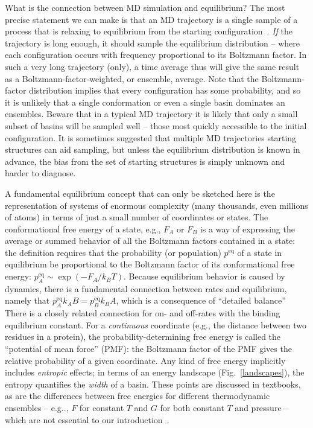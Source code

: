 \documentclass[9pt,bestpractices]{livecoms}
\newcommand{\peq}{p^{\mathrm{eq}}}
\begin{document}
What is the connection between MD simulation and equilibrium?  The most precise statement we can make is that an MD trajectory is a single sample of a process that is relaxing to equilibrium from the starting configuration~\cite{Zuckerman:2015:StatisticalBiophysicsBlog, Zuckerman:2010:}.  
\emph{If} the trajectory is long enough, it should sample the equilibrium distribution -- where each configuration occurs with frequency proportional to its Boltzmann factor.  
In such a very long trajectory (only), a time average thus will give the same result as a Boltzmann-factor-weighted, or ensemble, average.  
Note that the Boltzmann-factor distribution implies that every configuration has some probability, and so it is unlikely that a single conformation or even a single basin dominates an ensembles. 
Beware that in a typical MD trajectory it is likely that only a small subset of basins will be sampled well -- those most quickly accessible to the initial configuration.  
It is sometimes suggested that multiple MD trajectories starting structures can aid sampling, but unless the equilibrium distribution is known in advance, the bias from the set of starting structures is simply unknown and harder to diagnose.

A fundamental equilibrium concept that can only be sketched here is the representation of systems of enormous complexity (many thousands, even millions of atoms) in terms of just a small number of coordinates or states.  
The conformational free energy of a state, e.g., $F_A$ or $F_B$ is a way of expressing the average or summed behavior of all the Boltzmann factors contained in a state: the definition requires that the probability (or population) $\peq$ of a state in equilibrium be proportional to the Boltzmann factor of its conformational free energy: $\peq_A \sim \exp(-F_A/k_BT)$.  
Because equilibrium behavior is caused by dynamics, there is a fundamental connection between rates and equilibrium, namely that $\peq_A k_AB = \peq_B k_BA$, which is a consequence of ``detailed balance''
There is a closely related connection for on- and off-rates with the binding equilibrium constant.  
For a \emph{continuous} coordinate (e.g., the distance between two residues in a protein), the probability-determining free energy is called the “potential of mean force” (PMF): the Boltzmann factor of the PMF gives the relative probability of a given coordinate.  
Any kind of free energy implicitly includes \emph{entropic} effects; in terms of an energy landscape (Fig.\ \ref{landscapes}), the entropy quantifies the \emph{width} of a basin.  
These points are discussed in textbooks, as are the differences between free energies for different thermodynamic ensembles -- e.g.., $F$ for constant $T$ and $G$ for both constant $T$ and pressure -- which are not essential to our introduction~\cite{DillBook, Zuckerman:2010:}.
\end{document}
